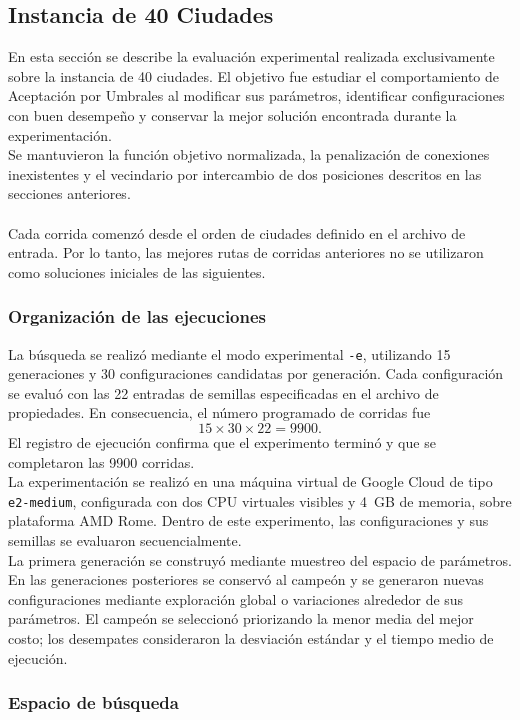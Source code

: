 \documentclass[12pt]{article}
\begin{document}
\subsection{Instancia de 40 Ciudades}
En esta sección se describe la evaluación experimental realizada
exclusivamente sobre la instancia de 40 ciudades. El objetivo fue estudiar
el comportamiento de Aceptación por Umbrales al modificar sus parámetros,
identificar configuraciones con buen desempeño y conservar la mejor
solución encontrada durante la experimentación.
\\
Se mantuvieron la función objetivo normalizada, la penalización de
conexiones inexistentes y el vecindario por intercambio de dos posiciones
descritos en las secciones anteriores. 
\\\\
Cada corrida comenzó desde el
orden de ciudades definido en el archivo de entrada. Por lo tanto, las
mejores rutas de corridas anteriores no se utilizaron como soluciones
iniciales de las siguientes.

\subsubsection{Organización de las ejecuciones}

La búsqueda se realizó mediante el modo experimental
\texttt{-e}, utilizando 15 generaciones y 30 configuraciones candidatas
por generación. Cada configuración se evaluó con las 22 entradas de
semillas especificadas en el archivo de propiedades. En consecuencia,
el número programado de corridas fue
\[
    15 \times 30 \times 22 = 9900.
\]
El registro de ejecución confirma que el experimento terminó y que se
completaron las 9900 corridas.
\\
La experimentación se realizó en una máquina virtual de Google Cloud de
tipo \texttt{e2-medium}, configurada con dos CPU virtuales visibles y
4~GB de memoria, sobre plataforma AMD Rome. Dentro de este experimento,
las configuraciones y sus semillas se evaluaron secuencialmente.
\\
La primera generación se construyó mediante muestreo del espacio de
parámetros. En las generaciones posteriores se conservó al campeón y
se generaron nuevas configuraciones mediante exploración global o
variaciones alrededor de sus parámetros. El campeón se seleccionó
priorizando la menor media del mejor costo; los desempates consideraron
la desviación estándar y el tiempo medio de ejecución.

\subsubsection{Espacio de búsqueda}
\end{document}
